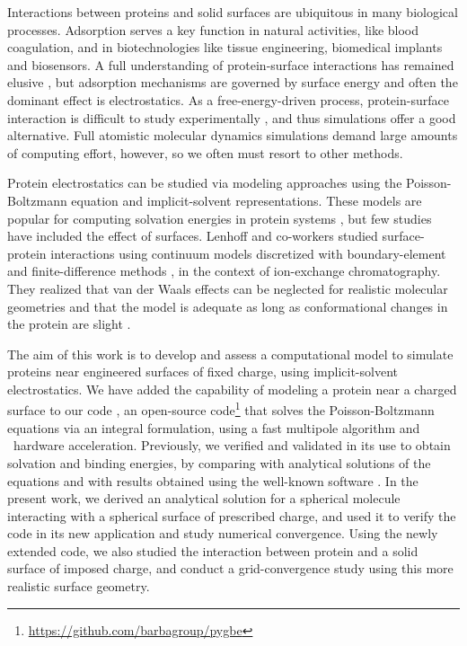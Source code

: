 
Interactions between proteins and solid surfaces are ubiquitous in many biological processes. Adsorption serves a key function in natural activities, like blood coagulation, and  in biotechnologies like tissue engineering, biomedical implants and biosensors.
A full understanding of protein-surface interactions has remained elusive \cite{Gray2004,RabeVerdesSeegel2011}, but adsorption mechanisms are governed by surface energy and often the dominant effect is electrostatics. As a free-energy-driven process, protein-surface interaction is difficult to study experimentally \cite{MijajlovicETal2013}, and thus simulations offer a good alternative. Full atomistic molecular dynamics simulations demand large amounts of computing effort, however, so we often must resort to other methods.

Protein electrostatics can be studied via modeling approaches using the Poisson-Boltzmann equation and implicit-solvent representations. These models  are popular for computing solvation energies in protein systems \cite{RouxSimonson1999,Bardhan2012}, but few studies have included the effect of surfaces. Lenhoff and co-workers studied surface-protein interactions using continuum models discretized with boundary-element \cite{YoonLenhoff1992,RothLenhoff1993,AsthagiriLenhoff1997} and finite-difference methods \cite{YaoLenhoff2004,YaoLenhoff2005}, in the context of ion-exchange chromatography. They realized that van der Waals effects can be neglected for realistic molecular geometries \cite{RothNealLenhoff1996} and that the model is adequate as long as conformational changes in the protein are slight \cite{YaoLenhoff2004,YaoLenhoff2005}. 

The aim of this work is to develop and assess a computational model to simulate proteins near engineered surfaces of fixed charge, using implicit-solvent electrostatics.
We have added the capability of modeling a protein near a charged surface to our code \pygbe, an open-source code\footnote{\url{https://github.com/barbagroup/pygbe}}  that solves the Poisson-Boltzmann equations via an integral formulation, using a fast multipole algorithm and \gpu\ hardware acceleration.  Previously, we verified and validated \pygbe in its use to obtain solvation and binding energies, by comparing with analytical solutions of the equations and with results obtained using the well-known \apbs software \cite{CooperBarba-share154331,CooperBardhanBarba2013}. 
In the present work, we derived an analytical solution for a spherical molecule interacting with a spherical surface of prescribed charge, and used it to verify the code in its new application and study numerical convergence.
Using the newly extended code, we also studied the interaction between protein \gb and a solid surface of imposed charge, 
and conduct a grid-convergence study using this more realistic surface geometry.

